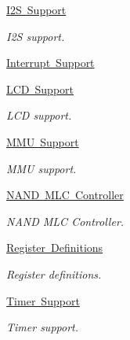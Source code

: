 \begin{DoxyCompactItemize}
\mbox{\hyperlink{group__lpc__i2s}{I2\+S Support}}
\begin{DoxyCompactList}\small\item\em I2S support. \end{DoxyCompactList}\item 
\mbox{\hyperlink{group__lpc32xx__interrupt}{Interrupt Support}}
\item 
\mbox{\hyperlink{group__lpc__lcd}{L\+C\+D Support}}
\begin{DoxyCompactList}\small\item\em L\+CD support. \end{DoxyCompactList}\item 
\mbox{\hyperlink{group__lpc32xx__mmu}{M\+M\+U Support}}
\begin{DoxyCompactList}\small\item\em M\+MU support. \end{DoxyCompactList}\item 
\mbox{\hyperlink{group__lpc32xx__nand__mlc}{N\+A\+N\+D M\+L\+C Controller}}
\begin{DoxyCompactList}\small\item\em N\+A\+ND M\+LC Controller. \end{DoxyCompactList}\item 
\mbox{\hyperlink{group__lpc32xx__reg}{Register Definitions}}
\begin{DoxyCompactList}\small\item\em Register definitions. \end{DoxyCompactList}\item 
\mbox{\hyperlink{group__lpc__timer}{Timer Support}}
\begin{DoxyCompactList}\small\item\em Timer support. \end{DoxyCompactList}\end{DoxyCompactItemize}
